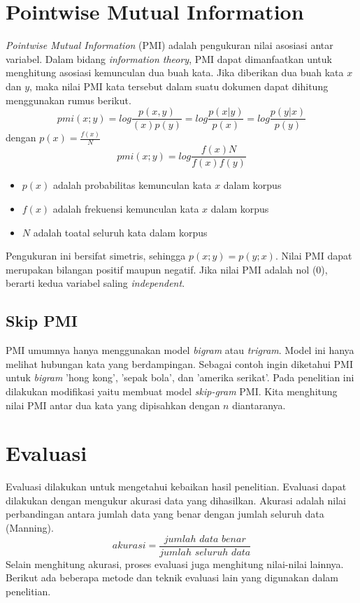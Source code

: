 \section{Pointwise Mutual Information}
\textit{Pointwise Mutual Information} (PMI) adalah pengukuran nilai asosiasi antar variabel. Dalam bidang \textit{information theory}, PMI dapat dimanfaatkan untuk menghitung asosiasi kemunculan dua buah kata. Jika diberikan dua buah kata $x$ dan $y$, maka nilai PMI kata tersebut dalam suatu dokumen dapat dihitung menggunakan rumus berikut. 
\[ pmi(x;y)=log\frac{p(x,y)}{(x)p(y)}=log\frac{p(x|y)}{p(x)}=log\frac{p(y|x)}{p(y)} \] dengan $p(x)=\frac{f(x)}{N}$
\[ pmi(x;y)=log\frac{f(x)N}{f(x)f(y)} \]
\begin{itemize}
  \item $p(x)$ adalah probabilitas kemunculan kata $x$ dalam korpus
  \item $f(x)$ adalah frekuensi kemunculan kata $x$ dalam korpus
  \item $N$ adalah toatal seluruh kata dalam korpus
\end{itemize}
Pengukuran ini bersifat simetris, sehingga $p(x;y)=p(y;x)$. Nilai PMI dapat merupakan bilangan positif maupun negatif. Jika nilai PMI adalah nol (0), berarti kedua variabel saling \textit{independent}.

\subsection{Skip PMI}
PMI umumnya hanya menggunakan model \textit{bigram} atau \textit{trigram}. Model ini hanya melihat hubungan kata yang berdampingan. Sebagai contoh ingin diketahui PMI untuk \textit{bigram} 'hong kong', 'sepak bola', dan 'amerika serikat'. Pada penelitian ini dilakukan modifikasi yaitu membuat model \textit{skip-gram} PMI. Kita menghitung nilai PMI antar dua kata yang dipisahkan dengan $n$ diantaranya. 

\section{Evaluasi}
Evaluasi dilakukan untuk mengetahui kebaikan hasil penelitian. Evaluasi dapat dilakukan dengan mengukur akurasi data yang dihasilkan. Akurasi adalah nilai perbandingan antara jumlah data yang benar dengan jumlah seluruh data (Manning). 
\[ akurasi=\frac{jumlah\,\,data\,\,benar}{jumlah\,\,seluruh\,\,data} \]
Selain menghitung akurasi, proses evaluasi juga menghitung nilai-nilai lainnya. Berikut ada beberapa metode dan teknik evaluasi lain yang digunakan dalam penelitian.

